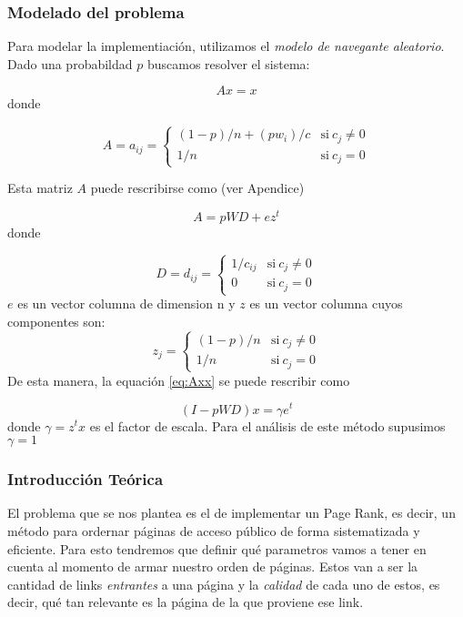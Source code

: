 \subsubsection*{Modelado del problema}
Para modelar la implementiaci\'on, utilizamos el \textit{modelo de navegante aleatorio}\cite{navegante}.
Dado una probabildad $p$ buscamos resolver el sistema:

\begin{equation}\label{eq:Axx}
    Ax = x
\end{equation}
donde 

\begin{equation}
 A = a_{ij} = \left\{
    \begin{array}{ll}
	 (1-p)/n + (p w_{i})/c & \mathrm{si\ } c_j\not=0\\
	 1/n & \mathrm{si\ } c_j=0
	 \end{array}
   \right.
\end{equation}

Esta matriz $A$ puede rescribirse como (ver Apendice)

\begin{equation}\label{eq:desarrollada}
    A = p WD + ez^{t}
\end{equation}
donde

\[
 D = d_{ij} = \left\{
    \begin{array}{ll}
	 1/c_{ij} & \mathrm{si\ } c_j\not=0\\
	 0 & \mathrm{si\ } c_j=0
	 \end{array}
   \right.
\]   
$e$ es un vector columna de dimension n y $z$ es un vector columna cuyos componentes son:
\[   
  z_{j} = \left\{
    \begin{array}{ll}
	 (1-p)/n & \mathrm{si\ } c_j\not=0\\
	 1/n & \mathrm{si\ } c_j=0
	 \end{array}
   \right.
\]  
De esta manera, la equaci\'on \ref{eq:Axx} se puede rescribir como

\begin{equation}\label{ipwd}
    (I - pWD)x = \gamma e^t 
\end{equation}
donde $\gamma = z^tx$ es el factor de escala. Para el an\'alisis de este m\'etodo supusimos
$\gamma = 1$


\subsubsection*{Introducción Teórica}

\par El problema que se nos plantea es el de implementar un Page Rank, es decir, 
un método para ordernar páginas de acceso público de forma sistematizada y eficiente. 
Para esto tendremos que definir qu\'e parametros vamos a tener en cuenta al momento de 
armar nuestro orden de páginas. Estos van a ser la cantidad de links \textit{entrantes} 
a una página y la \textit{calidad} de cada uno de estos, es decir, qu\'e tan relevante 
es la página de la que proviene ese link.\newline


